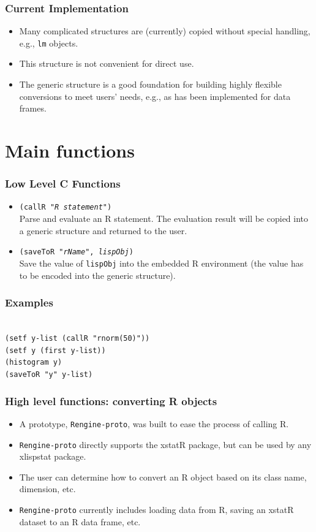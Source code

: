 \documentclass{beamer}
\begin{document}
\begin{frame}
\frametitle{Current Implementation}
\begin{itemize}
	\item Many complicated structures are (currently) copied without special handling, e.g., \texttt{lm} objects.
	\item This structure is not convenient for direct use.
	\item The generic structure is a good foundation for building highly flexible conversions to meet users' needs, e.g., as has been implemented for data frames.
\end{itemize}
\end{frame}

\section{Main functions}

\begin{frame}
\frametitle{Low Level C Functions}
\begin{itemize}
	\item \texttt{(callR "\emph{R statement}")}\\
	Parse and evaluate an R statement. The evaluation result will be copied into a generic structure and returned to the user.
	\item \texttt{(saveToR "\emph{rName}", \emph{lispObj})}\\
	Save the value of \texttt{lispObj} into the embedded R environment (the value has to be encoded into the 	generic structure).
\end{itemize}
\end{frame}

\begin{frame}
\frametitle{Examples}
\texttt{
\\
(setf y-list (callR "rnorm(50)")) \\
(setf y (first y-list)) \\
(histogram y) \\
(saveToR "y" y-list)
}
\end{frame}

\begin{frame}
\frametitle{High level functions: converting R objects}
\begin{itemize}
	\item A prototype, \texttt{Rengine-proto}, was built to ease the process of calling R.
	\item  \texttt{Rengine-proto} directly supports the xstatR package, but can be used by any xlispstat package.
	\item The user can determine how to convert an R object based on its class name, dimension, etc. 
	\item  \texttt{Rengine-proto} currently includes loading data from R, saving an xstatR dataset to an R data frame, etc.
\end{itemize}
\end{frame}
\end{document}
